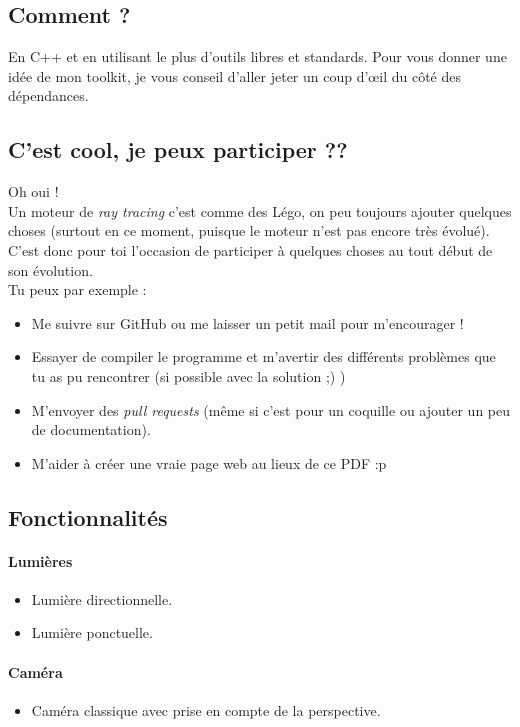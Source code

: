 \subsection{Comment ?}
En C++ et en utilisant le plus d'outils libres et standards. Pour vous donner
une idée de mon toolkit, je vous conseil d'aller jeter un coup d'œil du côté
des dépendances.

\subsection{C'est cool, je peux participer ??}
Oh oui !\\

Un moteur de \textsl{ray tracing} c'est comme des Légo, on peu toujours
ajouter quelques choses (surtout en ce moment, puisque le moteur n'est pas
encore très évolué). C'est donc pour toi l'occasion de participer à quelques
choses au tout début de son évolution.\\

Tu peux par exemple :
\begin{itemize}
  \item Me suivre sur GitHub ou me laisser un petit mail pour m'encourager !
  \item Essayer de compiler le programme et m'avertir des différents problèmes
    que tu as pu rencontrer (si possible avec la solution ;) )
  \item M'envoyer des \textsl{pull requests} (même si c'est pour un coquille
    ou ajouter un peu de documentation).
  \item M'aider à créer une vraie page web au lieux de ce PDF :p
\end{itemize}

\subsection{Fonctionnalités}
\paragraph{Lumières}
\begin{itemize}
  \item Lumière directionnelle.
  \item Lumière ponctuelle.
\end{itemize}

\paragraph{Caméra}
\begin{itemize}
  \item Caméra classique avec prise en compte de la perspective.
\end{itemize}

